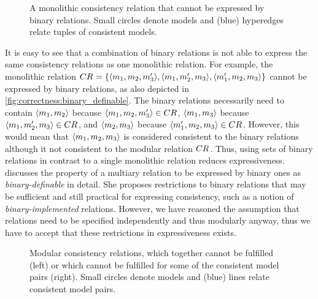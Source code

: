 \begin{figure}
    \centering
    
    \caption[Monolithic consistency relation that cannot be modularized]{A monolithic consistency relation that cannot be expressed by binary relations. Small circles denote models and (blue) hyperedges relate tuples of consistent models.}
    \label{fig:correctness:binary_definable}
\end{figure}

It is easy to see that a combination of binary relations is not able to express the same consistency relations as one monolithic relation.
For example, the monolithic relation $\consistencyrelation{CR}{} = \setted{\tupled{\model{m}{1}, \model{m}{2}, \model{m}{3}'}, \tupled{\model{m}{1}, \model{m}{2}', \model{m}{3}}, \tupled{\model{m}{1}', \model{m}{2}, \model{m}{3}}}$ cannot be expressed by binary relations, as also depicted in \autoref{fig:correctness:binary_definable}.
The binary relations necessarily need to contain $\tupled{\model{m}{1}, \model{m}{2}}$ because $\tupled{\model{m}{1}, \model{m}{2}, \model{m}{3}'} \in \consistencyrelation{CR}{}$, $\tupled{\model{m}{1}, \model{m}{3}}$ because $\tupled{\model{m}{1}, \model{m}{2}', \model{m}{3}} \in \consistencyrelation{CR}{}$, and $\tupled{\model{m}{2}, \model{m}{3}}$ because $\tupled{\model{m}{1}', \model{m}{2}, \model{m}{3}} \in \consistencyrelation{CR}{}$. However, this would mean that $\tupled{\model{m}{1}, \model{m}{2}, \model{m}{3}}$ is considered consistent to the binary relations although it not consistent to the modular relation $\consistencyrelation{CR}{}$.
Thus, using sets of binary relations in contrast to a single monolithic relation reduces expressiveness.
\textcite{stevens2020BidirectionalTransformationLarge-SoSym} discusses the property of a multiary relation to be expressed by binary ones as \emph{binary-definable} in detail.
She proposes restrictions to binary relations that may be sufficient and still practical for expressing consistency, such as a notion of \emph{binary-implemented} relations.
However, we have reasoned the assumption that relations need to be specified independently and thus modularly anyway, thus we have to accept that these restrictions in expressiveness exists.

\begin{figure}
    \centering
    
    \caption[Example for incompatible consistency relations]{Modular consistency relations, which together cannot be fulfilled (left) or which cannot be fulfilled for some of the consistent model pairs (right). Small circles denote models and (blue) lines relate consistent model pairs.}
    \label{fig:correctness:contradictions_example}
\end{figure}

